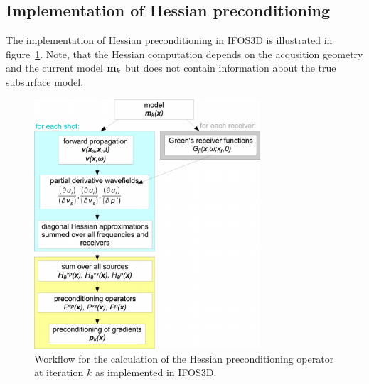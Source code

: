 \subsection{Implementation of Hessian preconditioning}
The implementation of Hessian preconditioning in IFOS3D is illustrated in figure~\ref{fig:workflow_hess}. Note, that the Hessian computation depends on the acqusition geometry and the current model $\textbf m_k$ but does not contain information about the true subsurface model.
\begin{figure}[h!]
\begin{center}
\includegraphics[width=0.75\textwidth]{fig/workflow_hess_22}
\caption[Workflow for the calculation of the Hessian preconditioning operator]{Workflow for the calculation of the Hessian preconditioning operator at iteration $k$ as implemented in IFOS3D.}\label{fig:workflow_hess}
\end{center}
\end{figure}
